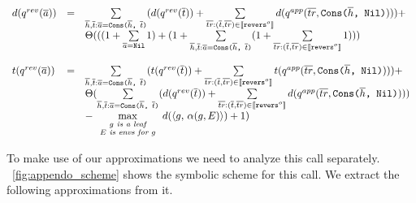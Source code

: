 \[
\begin{array}{lcl}
d(q^{rev}(\overline{a})) & = & \sum\limits_{\overline{h}, \overline{t}: \overline{a} = \texttt{Cons($\overline{h}$, $\overline{t}$)}} ( d(q^{rev}(\overline{t})) + \sum\limits_{\overline{tr}: (\overline{t}, \overline{tr}) \in \llbracket \texttt{revers$^o$} \rrbracket} d(q^{app}(\overline{tr},\texttt{Cons($\overline{h}$, Nil)}))) + \\
& & \Theta(((1 + \sum\limits_{\overline{a} = \texttt{Nil}} 1) + (1 + \sum\limits_{\overline{h}, \overline{t}: \overline{a} = \texttt{Cons($\overline{h}$, $\overline{t}$)}} (1 + \sum\limits_{\overline{tr}: (\overline{t}, \overline{tr}) \in \llbracket \texttt{revers$^o$} \rrbracket} 1))) \\
\\
t(q^{rev}(\overline{a})) & = & \sum\limits_{\overline{h}, \overline{t}: \overline{a} = \texttt{Cons($\overline{h}$, $\overline{t}$)}} ( t(q^{rev}(\overline{t})) + \sum\limits_{\overline{tr}: (\overline{t}, \overline{tr}) \in \llbracket \texttt{revers$^o$} \rrbracket} t(q^{app}(\overline{tr},\texttt{Cons($\overline{h}$, Nil)}))) + \\
& & \Theta( \sum\limits_{\overline{h}, \overline{t}: \overline{a} = \texttt{Cons($\overline{h}$, $\overline{t}$)}} ( d(q^{rev}(\overline{t})) + \sum\limits_{\overline{tr}: (\overline{t}, \overline{tr}) \in \llbracket \texttt{revers$^o$} \rrbracket} d(q^{app}(\overline{tr},\texttt{Cons($\overline{h}$, Nil)}))) \\
& & - \max\limits_{\scriptsize \begin{array}{c} g \textit{ is a leaf} \\ E \textit{ is envs for } g \end{array}} d(\langle g ,\, \alpha(g, E) \rangle) + 1) \\
\end{array}
\]

To make use of our approximations we need to analyze this call separately. \figureword~\ref{fig:appendo_scheme} shows the symbolic scheme for this call. We extract the following approximations from it.

